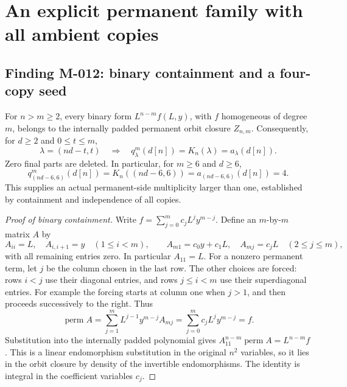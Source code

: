 \section{An explicit permanent family with all ambient copies}

\subsection*{Finding M-012: binary containment and a four-copy seed}
For \(n>m\geq2\), every binary form
\(L^{n-m}f(L,y)\), with \(f\) homogeneous of degree \(m\),
belongs to the internally padded permanent orbit closure
\(Z_{n,m}\). Consequently, for \(d\geq2\) and
\(0\leq t\leq m\),
\[
 \lambda=(nd-t,t)
 \quad\Longrightarrow\quad
           q^m_\lambda(d[n])=K_n(\lambda)=a_\lambda(d[n]).
                                                               \tag{M-012.1}
\]
Zero final parts are deleted. In particular, for \(m\geq6\)
and \(d\geq6\),
\[
 q^m_{(nd-6,6)}(d[n])=K_n((nd-6,6))
                    =a_{(nd-6,6)}(d[n])=4.             \tag{M-012.2}
\]
This supplies an actual permanent-side multiplicity larger than
one, established by containment and independence of all copies.

\begin{proof}[Proof of binary containment]
Write \(f=\sum_{j=0}^m c_j L^j y^{m-j}\). Define an
\(m\)-by-\(m\) matrix \(A\) by
\[
 A_{ii}=L,\quad A_{i,i+1}=y\quad(1\leq i<m),\qquad
 A_{m1}=c_0y+c_1L,\quad A_{mj}=c_jL\quad(2\leq j\leq m),
\]
with all remaining entries zero. In particular \(A_{11}=L\).
For a nonzero permanent term, let \(j\) be the column chosen
in the last row. The other choices are forced: rows \(i<j\)
use their diagonal entries, and rows \(j\leq i<m\)
use their superdiagonal entries. For example the forcing
starts at column one when \(j>1\), and then proceeds
successively to the right. Thus
\[
 \operatorname{perm}A
   =\sum_{j=1}^m L^{j-1}y^{m-j}A_{mj}
   =\sum_{j=0}^m c_j L^j y^{m-j}=f.
\]
Substitution into the internally padded polynomial gives
\(A_{11}^{n-m}\operatorname{perm}A=L^{n-m}f\).
This is a linear endomorphism substitution in the original
\(n^2\) variables, so it lies in the orbit closure by
density of the invertible endomorphisms. The identity is
integral in the coefficient variables \(c_j\).
\end{proof}

